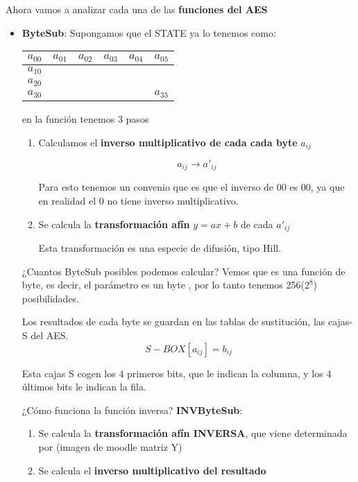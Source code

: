 Ahora vamos a analizar cada una de las \textbf{funciones del AES}
\begin{itemize}
	\item \textbf{ByteSub}:
	Supongamos que el STATE ya lo tenemos como:
	
	\begin{center}
		
		\begin{tabular}{l | c | r | r | r | r}
			$a_{00}$ & $a_{01}$ & $a_{02}$ & $a_{03}$ & $a_{04}$ & $a_{05}$\\
			\hline
			$a_{10}$ &   &   &   &   &  \\
			\hline
			$a_{20}$ &   &   &   &   &  \\
			\hline
			$a_{30}$ &   &   &   &   & $a_{35}$
			
		\end{tabular}
	\end{center}
	
	en la función tenemos 3 pasos
	\begin{enumerate}
		\item Calculamos el \textbf{inverso multiplicativo de cada cada byte} $a_{ij}$
		
		$$a_{ij} \rightarrow a'_{ij}$$
		
		Para esto tenemos un convenio que es que el inverso de $00$ es $00$, ya que en realidad el 0 no tiene inverso multiplicativo.
		
		\item Se calcula la \textbf{transformación afín} $y = ax +b$ de cada $a'_{ij}$
		
		Esta transformación es una especie de difusión, tipo Hill.
	\end{enumerate}
	
	¿Cuantos ByteSub posibles podemos calcular? Vemos que es una función de byte, es decir, el parámetro es un byte , por lo tanto tenemos 256($2^8$) posibilidades.
	
	Los resultados de cada byte se guardan en las tablas de sustitución, las cajas-S del AES.
	$$S-BOX[a_{ij}] = b_{ij}$$
	
	Esta cajas S cogen los 4 primeros bits, que le indican la columna, y los 4 últimos bits le indican la fila.
	
	¿Cómo funciona la función inversa? \textbf{INVByteSub}:
	\begin{enumerate}
		\item Se calcula la \textbf{transformación afín INVERSA}, que viene determinada por (imagen de moodle matriz Y)
		\item Se calcula el \textbf{inverso multiplicativo del resultado}
	\end{enumerate}
	

\end{itemize}
